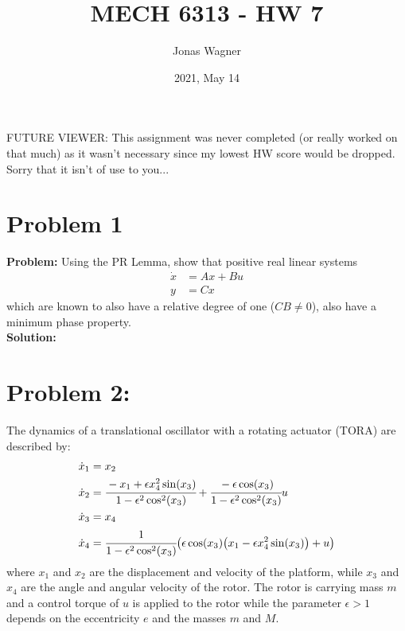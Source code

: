 \documentclass[letter]{article}
\title{MECH 6313 - HW 7}
\author{Jonas Wagner}
\date{2021, May 14}
\numberwithin{equation}{section}
\begin{document}
	
	
FUTURE VIEWER:
This assignment was never completed (or really worked on that much)
as it wasn't necessary since my lowest HW score would be dropped.
Sorry that it isn't of use to you... 
	

\maketitle

\tableofcontents

\newpage
\section{Problem 1}
\textbf{Problem:}
Using the PR Lemma, show that positive real linear systems
\begin{equation}
	\begin{aligned}
		\dot{x} &= Ax + Bu\\
		y &= Cx
	\end{aligned}
\end{equation}
which are known to also have a relative degree of one ($CB \neq 0$), also have a minimum phase property.\\

\noindent
\textbf{Solution:}









\newpage
\section{Problem 2:}
The dynamics of a translational oscillator with a rotating actuator (TORA) are described by:
\begin{equation}
	\begin{aligned}
		\dot{x}_1 &= x_2\\
		\dot{x}_2 &= \cfrac{-x_1 + \epsilon x_4^2 \sin(x_3)}{1 - \epsilon^2 \cos[2](x_3)} + \cfrac{- \epsilon \cos(x_3)}{1 - \epsilon^2 \cos[2](x_3)} u\\
		\dot{x}_3 &= x_4\\
		\dot{x}_4 &= \cfrac{1}{1-\epsilon^2 \cos[2](x_3)} \qty(\epsilon \cos(x_3) \qty(x_1 - \epsilon x_4^2 \sin(x_3)) + u)
	\end{aligned}
\end{equation}
where $x_1$ and $x_2$ are the displacement and velocity of the platform, while $x_3$ and $x_4$ are the angle and angular velocity of the rotor. The rotor is carrying mass $m$ and a control torque of $u$ is applied to the rotor while the parameter $\epsilon > 1$ depends on the eccentricity $e$ and the masses $m$ and $M$.\\
\end{document}
